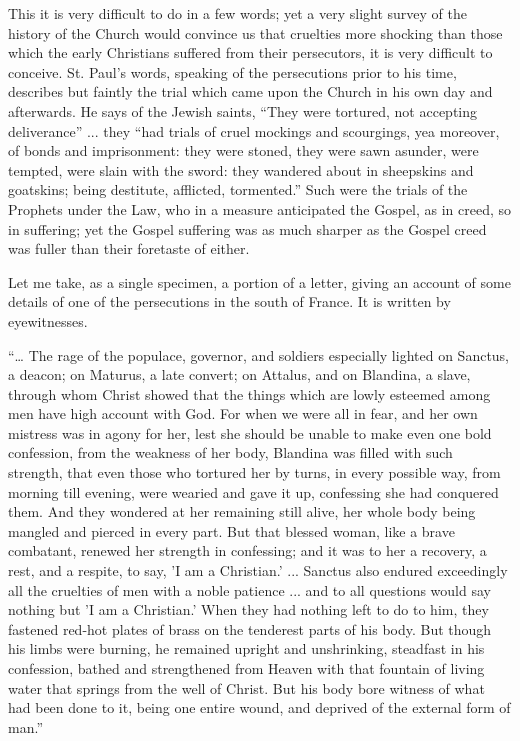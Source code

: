 This it is very difficult to do in a few words; yet a very slight
survey of the history of the Church would convince us that cruelties
more shocking than those which the early Christians suffered from
their persecutors, it is very difficult to conceive. St. Paul's words,
speaking of the persecutions prior to his time, describes but faintly
the trial which came upon the Church in his own day and afterwards. He
says of the Jewish saints, ``They were tortured, not accepting
deliverance'' ... they ``had trials of cruel mockings and
scourgings, yea moreover, of bonds and imprisonment: they were stoned,
they were sawn asunder, were tempted, were slain with the sword: they
wandered about in sheepskins and goatskins; being destitute,
afflicted, tormented.'' Such were the trials of the Prophets under
the Law, who in a measure anticipated the Gospel, as in creed, so in
suffering; yet the Gospel suffering was as much sharper as the
Gospel creed was fuller than their foretaste of either.

Let me take, as a single specimen, a portion of a letter, giving an
account of some details of one of the persecutions in the south of
France. It is written by eyewitnesses.

``… The rage of the populace, governor, and soldiers
especially lighted on Sanctus, a deacon; on Maturus, a late convert;
on Attalus, and on Blandina, a slave, through whom Christ showed that
the things which are lowly esteemed among men have high account with
God. For when we were all in fear, and her own mistress was in agony
for her, lest she should be unable to make even one bold confession,
from the weakness of her body, Blandina was filled with such strength,
that even those who tortured her by turns, in every possible way, from
morning till evening, were wearied and gave it up, confessing she had
conquered them. And they wondered at her remaining still alive, her
whole body being mangled and pierced in every part. But that blessed
woman, like a brave combatant, renewed her strength in confessing; and
it was to her a recovery, a rest, and a respite, to say, 'I am a
Christian.' ... Sanctus also endured exceedingly all the cruelties of men
with a noble patience ... and to all questions would say nothing but
'I am a Christian.' When they had nothing left to do to him, they
fastened red-hot plates of brass on the tenderest parts of his body.
But though his limbs were burning, he remained upright and
unshrinking, steadfast in his confession, bathed and strengthened from
Heaven with that fountain of living water that springs from the well
of Christ. But his body bore witness of what had been done to it,
being one entire wound, and deprived of the external form of
man.''


